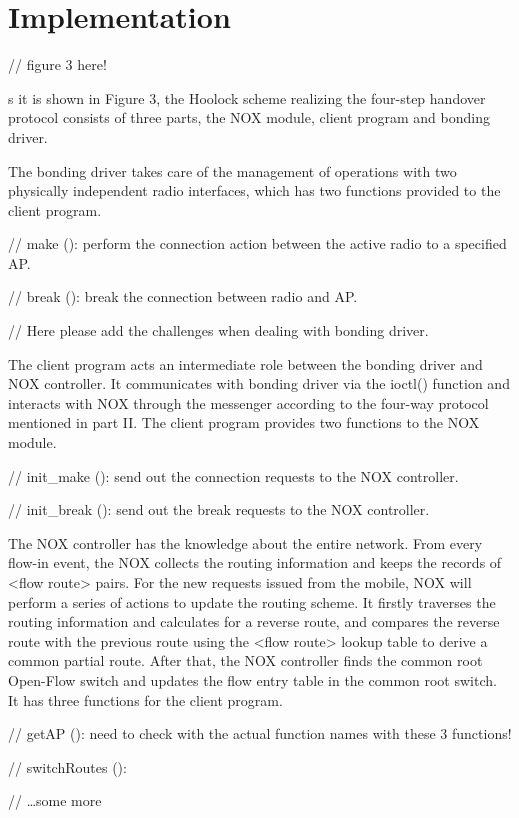 \section{Implementation}\label{impl}

// figure 3 here!

s it is shown in Figure 3, the Hoolock scheme realizing the four-step handover protocol consists of three parts, the NOX module, client program and bonding driver.

The bonding driver takes care of the management of operations with two physically independent radio interfaces, which has two functions provided to the client program.

// make (): perform the connection action between the active radio to a specified AP.

// break (): break the connection between radio and AP.

// Here please add the challenges when dealing with bonding driver.

The client program acts an intermediate role between the bonding driver and NOX controller. It communicates with bonding driver via the ioctl() function and interacts with NOX through the messenger according to the four-way protocol mentioned in part II. The client program provides two functions to the NOX module.

// init_make (): send out the connection requests to the NOX controller.

// init_break (): send out the break requests to the NOX controller.

The NOX controller has the knowledge about the entire network. From every flow-in event, the NOX collects the routing information and keeps the records of <flow route> pairs. For the new requests issued from the mobile, NOX will perform a series of actions to update the routing scheme. It firstly traverses the routing information and calculates for a reverse route, and compares the reverse route with the previous route using the <flow route> lookup table to derive a common partial route. After that, the NOX controller finds the common root Open-Flow switch and updates the flow entry table in the common root switch. It has three functions for the client program.

// getAP (): need to check with the actual function names with these 3 functions!

// switchRoutes ():

// …some more
